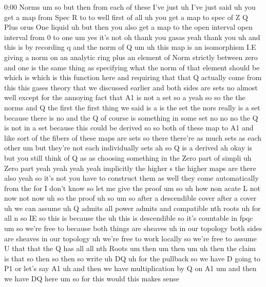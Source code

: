 \begin{unfinished}{0:00}
Norms  um  so  but  then  from  each  of  these
I've  just  uh  I've  just
said  uh  you  get  a  map  from  Spec
R  to  to  well  first  of  all  uh  you  get  a
map  to  spec  of  Z  Q  Plus  orus  One
liquid  uh  but  then  you  also  get  a  map  to
the  open  interval  open  interval  from  0
to
one
um  yes  it's  not  oh  thank  you  gasas  yeah
thank  you
uh  and  this  is  by  recording  q  and  the
norm  of
Q
um
uh  this  map  is  an
isomorphism
I.E  giving  a  norm  on  an  analytic  ring
plus  an  element  of  Norm  strictly  between
zero  and  one  is  the  same  thing  as
specifying  what  the  norm  of  that  element
should  be  which  is
which  is  this  function  here  and
requiring  that  that  Q  actually  come  from
this  this  gases  theory  that  we  discussed
earlier  and  both  sides  are  sets  no
almost  well  except  for  the  annoying  fact
that  A1  is  not  a  set
so
a  yeah  so  so  the  the
norms  and  Q  the  first  the  first  thing  we
said  is  a  is  the  set  the  nors  really  is
a  set  because  there  is  no  and  the  Q  of
course  is  something  in  some  set  no  no  no
the  Q  is  not  in  a  set  because  this  could
be
derived  so  so  both  of  these  map  to
A1  and  like  sort  of  the  fibers  of  these
maps  are  sets  so  there  there're  as  much
sets  as  each  other  um  but  they're  not
each  individually
sets  ah  so  Q  is  a
derived
ah  okay  is  but  you  still  think  of  Q  as
as  choosing  something  in  the  Zero  part
of  simpli  uh  Zero  part  yeah  yeah  yeah
yeah  implicitly  the  higher  s  the  higher
maps  are  there  also  yeah  so  it's  not  you
have  to  construct  them  as  well  they  come
automatically  from  the  for  I  don't
know  so  let  me  give  the  proof  um  so  uh
how  non  acate
L  not  now  not  now  uh  so  the  proof  uh  so
um  so  after  a  descendible  cover  after  a
cover  uh  we  can
assume  uh  Q  admits  all  power
admits  and
compatible  nth  roots
uh  for  all  n  so  IE  so  this  is  because
the  uh  this  is  descendible
so  it's  countable  in
fpqc  um  so  we're  free  to  because  both
things  are  sheaves  uh  in  our  topology
both  sides  are  sheaves  in  our  topology
uh  we're  free  to  work  locally  so  we're
free  to  assume  U  that  that  the  Q  has  all
all  nth  Roots
um  then
um  then
um  uh  then  the  claim  is  that  so  then  so
then  so
write  uh
DQ  uh  for  the
pullback  so  we  have  D  going  to  P1  or
let's  say  A1
uh  and  then  we  have  multiplication  by  Q
on  A1  um  and  then  we  have  DQ
here
um  so  for  this  would  this  makes  sense

\end{unfinished}
